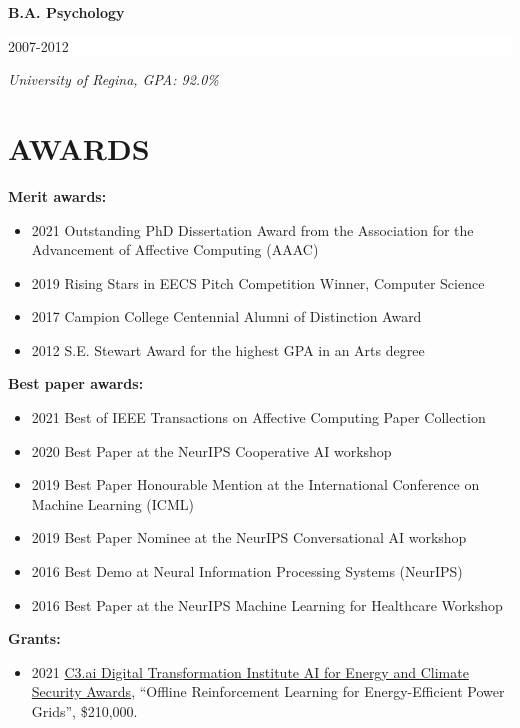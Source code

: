 \documentclass[paper=letter,fontsize=11pt]{scrartcl} %
\newcommand{\NewPart}[2]{\section*{\uppercase{#1} #2}}
\newcommand{\EducationEntry}[3]{
        \noindent \textbf{#1} \hfill      %
        \colorbox{White}{%
            \parbox{10em}{%
            \hfill\color{Black}#2}} \par  %
        \noindent \textit{#3} \par}
\begin{document}
\EducationEntry{B.A. Psychology}{2007-2012}{University of Regina, GPA: 92.0\%}

\NewPart{Awards}{}

\noindent \textbf{Merit awards:}
\begin{itemize}
\item 2021 Outstanding PhD Dissertation Award from the Association for the Advancement of Affective Computing (AAAC) %
\item 2019 Rising Stars in EECS Pitch Competition Winner, Computer Science
\item 2017 Campion College Centennial Alumni of Distinction Award
\item 2012 S.E. Stewart Award for the highest GPA in an Arts degree
\end{itemize}

\noindent \textbf{Best paper awards:}
\begin{itemize}
\item 2021 Best of IEEE Transactions on Affective Computing Paper Collection
\item 2020 Best Paper at the NeurIPS Cooperative AI workshop
\item 2019 Best Paper Honourable Mention at the International Conference on Machine Learning (ICML)
\item 2019 Best Paper Nominee at the NeurIPS Conversational AI workshop
\item 2016 Best Demo at Neural Information Processing Systems (NeurIPS)
\item 2016 Best Paper at the NeurIPS Machine Learning for Healthcare Workshop
\end{itemize}

\noindent \textbf{Grants:}
\begin{itemize}
\item 2021 \href{https://c3dti.ai/c3-announces-energy-climate-awards/}{C3.ai Digital Transformation Institute AI for Energy and Climate Security Awards}, “Offline Reinforcement Learning for Energy-Efficient Power Grids”, \$210,000. %
\end{itemize}
\end{document}
